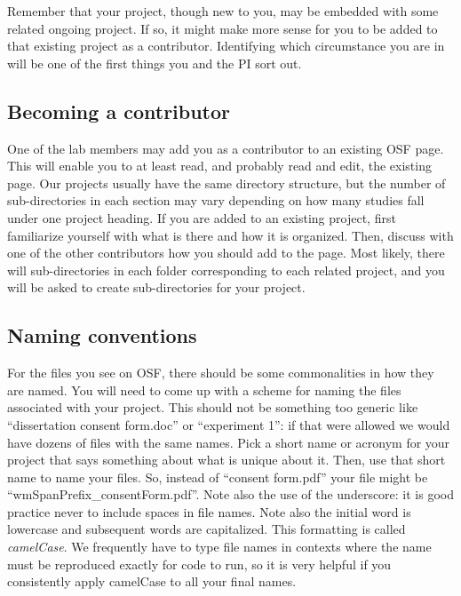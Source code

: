 \documentclass[
  12pt,
]{book}
\begin{document}
Remember that your project, though new to you, may be embedded with some related ongoing project. If so, it might make more sense for you to be added to that existing project as a contributor. Identifying which circumstance you are in will be one of the first things you and the PI sort out.

\subsection{Becoming a contributor}\label{becoming-a-contributor}

One of the lab members may add you as a contributor to an existing OSF page. This will enable you to at least read, and probably read and edit, the existing page. Our projects usually have the same directory structure, but the number of sub-directories in each section may vary depending on how many studies fall under one project heading. If you are added to an existing project, first familiarize yourself with what is there and how it is organized. Then, discuss with one of the other contributors how you should add to the page. Most likely, there will sub-directories in each folder corresponding to each related project, and you will be asked to create sub-directories for your project.

\subsection{Naming conventions}\label{naming-conventions}

For the files you see on OSF, there should be some commonalities in how they are named. You will need to come up with a scheme for naming the files associated with your project. This should not be something too generic like ``dissertation consent form.doc'' or ``experiment 1'': if that were allowed we would have dozens of files with the same names. Pick a short name or acronym for your project that says something about what is unique about it. Then, use that short name to name your files. So, instead of ``consent form.pdf'' your file might be ``wmSpanPrefix\_consentForm.pdf''. Note also the use of the underscore: it is good practice never to include spaces in file names. Note also the initial word is lowercase and subsequent words are capitalized. This formatting is called \emph{camelCase}. We frequently have to type file names in contexts where the name must be reproduced exactly for code to run, so it is very helpful if you consistently apply camelCase to all your final names.
\end{document}
